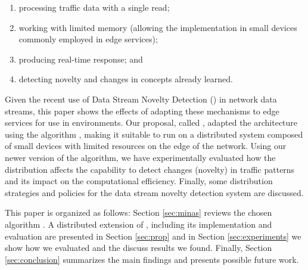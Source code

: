 \begin{enumerate}[label=(\emph{\roman*})]
    \item processing traffic data with a single read;
    \item working with limited memory (allowing the implementation in small
    devices commonly employed in edge services);
    \item producing real-time response; and
    \item detecting novelty and changes in concepts already learned.
\end{enumerate}

Given the recent \cite{Viegas2019,AndreoniLopez2019,DaCosta2019a} use of Data Stream Novelty
Detection (\nd) in network data streams, this paper shows the effects of
adapting these mechanisms to edge services for use in \iot environments.
Our proposal, called \mfog, adapted the \arch
architecture \cite{Cassales2019a} using the \nd algorithm \minas
\cite{Faria2013Minas,Faria2015minas}, making it suitable to run
on a distributed system composed of small devices with limited
resources on the edge of the network.
Using our newer version of the \minas algorithm, we have experimentally evaluated 
how the distribution 
affects the capability to detect changes (novelty) in
traffic patterns and its impact on the computational efficiency.
Finally, some distribution strategies and policies for the data stream
novelty detection system are discussed.

This paper is organized as follows:
Section \ref{sec:minas} reviews the chosen \nd algorithm \minas.
A distributed extension of \minas, including its
implementation and evaluation are presented in Section \ref{sec:prop}
and in Section \ref{sec:experiments} we show how we evaluated \mfog and
the discuss results we found.
Finally, Section \ref{sec:conclusion} summarizes the main findings and presents
possible future work.


